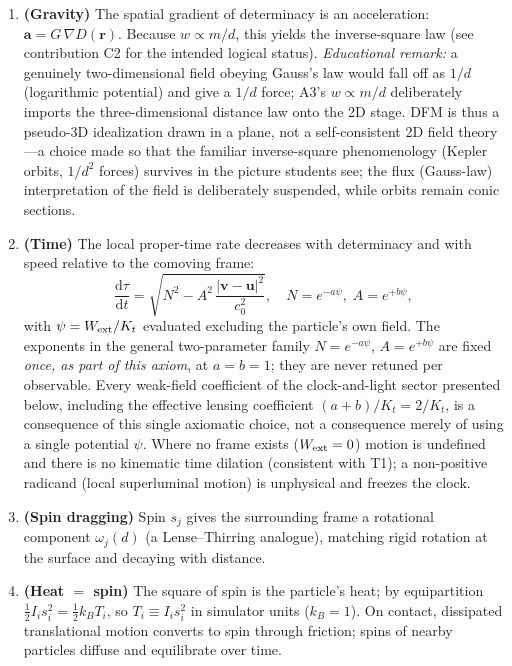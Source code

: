 \documentclass[aps,reprint,amsmath,amssymb,nofootinbib,superscriptaddress,floatfix]{revtex4-2}
\newcommand{\ud}{\mathrm{d}}
\newcommand{\vect}[1]{\bm{#1}}
\newcommand{\Kt}{K_t}
\begin{document}
\begin{enumerate}
\item[A6.]{\bf (Gravity)} The spatial gradient of determinacy is an
acceleration: $\vect{a} = G\,\nabla D(\vect{r})$.
Because $w \propto m/d$, this yields the inverse-square law
(see contribution C2 for the intended logical status).
\emph{Educational remark:} a genuinely two-dimensional field obeying
Gauss's law would fall off as $1/d$ (logarithmic potential) and give a
$1/d$ force; A3's $w \propto m/d$ deliberately imports the
three-dimensional distance law onto the 2D stage.
DFM is thus a pseudo-3D idealization drawn in a plane, not a
self-consistent 2D field theory---a choice made so that the familiar
inverse-square phenomenology (Kepler orbits, $1/d^2$ forces) survives
in the picture students see; the flux (Gauss-law) interpretation of
the field is deliberately suspended, while orbits remain conic
sections.

\item[A7$'$.]{\bf (Time)} The local proper-time rate decreases with
determinacy and with speed relative to the comoving frame:
\begin{equation}
\frac{\ud\tau}{\ud t}
 = \sqrt{N^2 - A^2\,\frac{|\vect{v}-\vect{u}|^2}{c_0^2}},
\quad
N = e^{-a\psi},\; A = e^{+b\psi},
\label{eq:A7}
\end{equation}
with $\psi = W_{\rm ext}/\Kt$ evaluated excluding the particle's own
field.
The exponents in the general two-parameter family
$N = e^{-a\psi}$, $A = e^{+b\psi}$ are fixed \emph{once, as part of
this axiom}, at $a = b = 1$; they are never retuned per observable.
Every weak-field coefficient of the clock-and-light sector presented
below, including the effective lensing coefficient
$(a+b)/\Kt = 2/\Kt$, is a consequence of this single axiomatic choice,
not a consequence merely of using a single potential $\psi$.
Where no frame exists ($W_{\rm ext}=0$) motion is undefined and there
is no kinematic time dilation (consistent with T1); a non-positive
radicand (local superluminal motion) is unphysical and freezes the
clock.

\item[A8.]{\bf (Spin dragging)} Spin $s_j$ gives the surrounding frame
a rotational component $\omega_j(d)$ (a Lense--Thirring analogue),
matching rigid rotation at the surface and decaying with distance.

\item[A9.]{\bf (Heat $=$ spin)} The square of spin is the particle's
heat; by equipartition $\tfrac12 I_i s_i^2 = \tfrac12 k_B T_i$, so
$T_i \equiv I_i s_i^2$ in simulator units ($k_B = 1$).
On contact, dissipated translational motion converts to spin through
friction; spins of nearby particles diffuse and equilibrate over time.


\end{enumerate}
\end{document}
